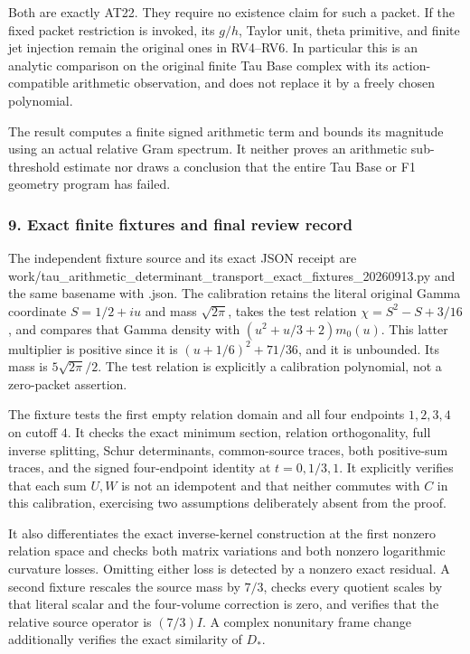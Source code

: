 Both are exactly AT22. They require no existence claim for such a packet. If the fixed packet restriction is invoked, its \(g/h\), Taylor unit, theta primitive, and finite jet injection remain the original ones in RV4--RV6. In particular this is an analytic comparison on the original finite Tau Base complex with its action-compatible arithmetic observation, and does not replace it by a freely chosen polynomial.

The result computes a finite signed arithmetic term and bounds its magnitude using an actual relative Gram spectrum. It neither proves an arithmetic sub-threshold estimate nor draws a conclusion that the entire Tau Base or F1 geometry program has failed.

\subsubsection{9. Exact finite fixtures and final review record}\label{endpoint-determinant_review--exact-finite-fixtures-and-final-review-record}

The independent fixture source and its exact JSON receipt are work/tau\_arithmetic\_determinant\_transport\_exact\_fixtures\_20260913.py and the same basename with .json. The calibration retains the literal original Gamma coordinate \(S=1/2+iu\) and mass \(\sqrt{2\pi}\), takes the test relation \(\chi=S^2-S+3/16\), and compares that Gamma density with \((u^2+u/3+2)m_0(u)\). This latter multiplier is positive since it is \((u+1/6)^2+71/36\), and it is unbounded. Its mass is \(5\sqrt{2\pi}/2\). The test relation is explicitly a calibration polynomial, not a zero-packet assertion.

The fixture tests the first empty relation domain and all four endpoints \(1,2,3,4\) on cutoff \(4\). It checks the exact minimum section, relation orthogonality, full inverse splitting, Schur determinants, common-source traces, both positive-sum traces, and the signed four-endpoint identity at \(t=0,1/3,1\). It explicitly verifies that each sum \(U,W\) is not an idempotent and that neither commutes with \(C\) in this calibration, exercising two assumptions deliberately absent from the proof.

It also differentiates the exact inverse-kernel construction at the first nonzero relation space and checks both matrix variations and both nonzero logarithmic curvature losses. Omitting either loss is detected by a nonzero exact residual. A second fixture rescales the source mass by \(7/3\), checks every quotient scales by that literal scalar and the four-volume correction is zero, and verifies that the relative source operator is \((7/3)I\). A complex nonunitary frame change additionally verifies the exact similarity of \(D_*\).

